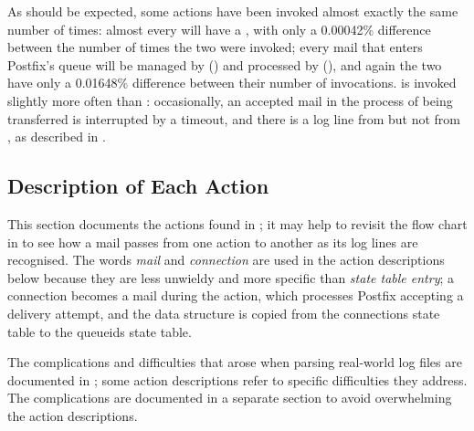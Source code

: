 As should be expected, some actions have been invoked almost exactly the
same number of times: almost every  will have a
, with only a 0.00042\% difference between the number of
times the two were invoked; every mail that enters Postfix's queue will be
managed by  () and processed by
 (), and again the two have
only a 0.01648\% difference between their number of invocations.
 is invoked slightly more often than
: occasionally, an accepted mail in the process of
being transferred is interrupted by a timeout, and there is a log line from
 but not from , as described in
.



\FloatBarrier{}

\subsection{Description of Each Action}

\label{actions in detail in implementation}

This section documents the actions found in \parsername{}; it may help to
revisit the flow chart in  to see how a mail passes
from one action to another as its log lines are recognised.  The words
\textit{mail\/} and \textit{connection\/} are used in the action
descriptions below because they are less unwieldy and more specific than
\textit{state table entry\/}; a connection becomes a mail during the
 action, which processes Postfix accepting a delivery
attempt, and the data structure is copied from the connections state table
to the queueids state table.

The complications and difficulties that arose when parsing real-world log
files are documented in ; some action
descriptions refer to specific difficulties they address.  The
complications are documented in a separate section to avoid overwhelming
the action descriptions.

